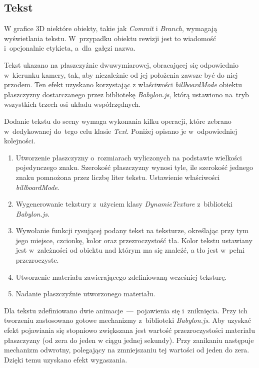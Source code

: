 \documentclass[12pt,a4paper,polish,thesis]{dcsbook}
\begin{document}
{\begin{description}
	\end{description}

	\subsection{Tekst}
	W grafice 3D niektóre obiekty, takie jak \textit{Commit} i \textit{Branch}, wymagają wyświetlania tekstu. W~przypadku obiektu rewizji jest to wiadomość i~opcjonalnie etykieta, a~dla~gałęzi nazwa.

	Tekst ukazano na płaszczyźnie dwuwymiarowej, obracającej się odpowiednio w~kierunku kamery, tak, aby niezależnie od jej położenia zawsze być do niej przodem. Ten efekt uzyskano korzystając z właściwości \textit{billboardMode} obiektu płaszczyzny dostarczanego przez bibliotekę \textit{Babylon.js}, którą ustawiono na~tryb wszystkich trzech osi układu współrzędnych.

	Dodanie tekstu do sceny wymaga wykonania kilku operacji, które zebrano w~dedykowanej do~tego celu klasie \textit{Text}. Poniżej opisano je w~odpowiedniej kolejności.

	\begin{enumerate}
		\item Utworzenie płaszczyzny o~rozmiarach wyliczonych na podstawie wielkości pojedynczego znaku. Szerokość płaszczyzny wynosi tyle, ile szerokość jednego znaku pomnożona przez liczbę liter tekstu. Ustawienie właściwości \textit{billboardMode}.

		\item Wygenerowanie tekstury z~użyciem klasy \textit{DynamicTexture} z~biblioteki \textit{Babylon.js}.

		\item Wywołanie funkcji rysującej podany tekst na teksturze, określając przy tym jego miejsce, czcionkę, kolor oraz przezroczystość tła. Kolor tekstu ustawiany jest w~zależności od obiektu nad którym ma się znaleźć, a tło jest w~pełni przezroczyste.

		\item Utworzenie materiału zawierającego zdefiniowaną wcześniej teksturę.

		\item Nadanie płaszczyźnie utworzonego materiału.
	\end{enumerate}

	Dla tekstu zdefiniowano dwie animacje~---~pojawienia się i~zniknięcia. Przy ich tworzeniu zastosowano gotowe mechanizmy z~biblioteki \textit{Babylon.js}. Aby uzyskać efekt pojawiania się stopniowo zwiększana jest wartość przezroczystości materiału płaszczyzny (od zera do jeden w ciągu jednej sekundy). Przy zanikaniu następuje mechanizm odwrotny, polegający na zmniejszaniu tej wartości od jeden do zera. Dzięki temu uzyskano efekt wygaszania.

}
\end{document}
